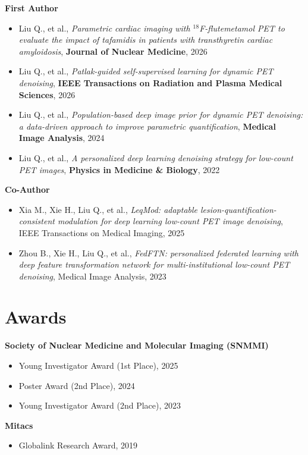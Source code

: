 \textbf{First Author}
\begin{itemize}[leftmargin=*]
\item Liu Q., et al., \textit{Parametric cardiac imaging with $^{18}$F-flutemetamol PET to evaluate the impact of tafamidis in patients with transthyretin cardiac amyloidosis}, \textbf{Journal of Nuclear Medicine}, 2026
\item Liu Q., et al., \textit{Patlak-guided self-supervised learning for dynamic PET denoising}, \textbf{IEEE Transactions on Radiation and Plasma Medical Sciences}, 2026
\item Liu Q., et al., \textit{Population-based deep image prior for dynamic PET denoising: a data-driven approach to improve parametric quantification}, \textbf{Medical Image Analysis}, 2024
\item Liu Q., et al., \textit{A personalized deep learning denoising strategy for low-count PET images}, \textbf{Physics in Medicine \& Biology}, 2022
\end{itemize}

\textbf{Co-Author}
\begin{itemize}[leftmargin=*]
\item Xia M., Xie H., Liu Q., et al., \textit{LeqMod: adaptable lesion-quantification-consistent modulation for deep learning low-count PET image denoising}, IEEE Transactions on Medical Imaging, 2025
\item Zhou B., Xie H., Liu Q., et al., \textit{FedFTN: personalized federated learning with deep feature transformation network for multi-institutional low-count PET denoising}, Medical Image Analysis, 2023
\end{itemize}

\section{Awards}
\textbf{Society of Nuclear Medicine and Molecular Imaging (SNMMI)}
\begin{itemize}[leftmargin=*]
\item Young Investigator Award (1st Place), 2025
\item Poster Award (2nd Place), 2024
\item Young Investigator Award (2nd Place), 2023
\end{itemize}

\textbf{Mitacs}
\begin{itemize}[leftmargin=*]
\item Globalink Research Award, 2019
\end{itemize}